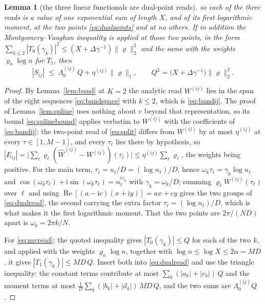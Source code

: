 \documentclass[11pt,a4paper]{article}
\theoremstyle{plain}
\newtheorem{lemma}[theorem]{Lemma}
\theoremstyle{definition}
\begin{document}
\begin{lemma}[the three linear functionals are dual-point reads]
so each of the three reads is a value of one exponential sum of length $X$, and
of its first logarithmic moment, at the two points \eqref{eq:dualpoints} and at
no others. If in addition the Montgomery--Vaughan inequality
\cite{MontgomeryVaughan1974} is applied at those two points, in the form
$\sum_{k\le2}|T_0(\gamma_k)|^{2}
\le(X+\Delta\gamma^{-1})\lVert\varrho\rVert_2^{2}$ and the same with the weights
$\varrho_n\log n$ for $T_1$, then
\begin{equation}
\label{eq:mvread}
  |S_{ij}|\;\le\;\Lambda_0^{(ij)}\,Q+\eta^{(ij)}\lVert\varrho\rVert_1,
  \qquad
  Q^{2}=\bigl(X+\Delta\gamma^{-1}\bigr)\lVert\varrho\rVert_2^{2} .
\end{equation}
\end{lemma}

\begin{proof}
By Lemma~\ref{lem:band} at $K=2$ the analytic read $W^{(ij)}$ lies in the span
of the eight sequences \eqref{eq:bandspace} with $k\le2$, which is
\eqref{eq:bandij}. The proof of Lemma~\ref{lem:spline} uses nothing about $v$
beyond that representation, so its bound \eqref{eq:splinebound} applies verbatim
to $W^{(ij)}$ with the coefficients of \eqref{eq:bandij}: the two-point read of
\eqref{eq:split} differs from $W^{(ij)}$ by at most $\eta^{(ij)}$ at every
$\tau\in[1,M-1]$, and every $\tau_\ell$ lies there by hypothesis, so
$|E_{ij}|=\bigl|\sum_\ell\varrho_\ell
(\widehat W^{(ij)}-W^{(ij)})(\tau_\ell)\bigr|
\le\eta^{(ij)}\sum_\ell\varrho_\ell$, the weights being positive. For the main
term, $\tau_\ell=u_\ell/D=(\log n_\ell)/D$, hence
$\omega_k\tau_\ell=\gamma_k\log n_\ell$ and
$\cos(\omega_k\tau_\ell)+\mathrm i\sin(\omega_k\tau_\ell)
=n_\ell^{\mathrm i\gamma_k}$ with $\gamma_k=\omega_k/D$; summing
$\varrho_\ell W^{(ij)}(\tau_\ell)$ over $\ell$ and using
$\operatorname{Re}[(a-\mathrm ic)(x+\mathrm iy)]=ax+cy$ gives the two groups of
\eqref{eq:dualread}, the second carrying the extra factor
$\tau_\ell=(\log n_\ell)/D$, which is what makes it the first logarithmic
moment. That the two points are $2\pi/(ND)$ apart is $\omega_k=2\pi k/N$.

For \eqref{eq:mvread}: the quoted inequality gives $|T_0(\gamma_k)|\le Q$ for
each of the two $k$, and applied with the weights $\varrho_n\log n$, together
with $\log n\le\log X\le2\alpha=MD$, it gives $|T_1(\gamma_k)|\le MD\,Q$.
Insert both into \eqref{eq:dualread} and use the triangle inequality: the
constant terms contribute at most $\sum_k(|a_k|+|c_k|)\,Q$ and the moment terms
at most $\tfrac1D\sum_k(|b_k|+|d_k|)\,MD\,Q$, and the two sums are
$\Lambda_0^{(ij)}Q$.
\end{proof}
\end{document}
